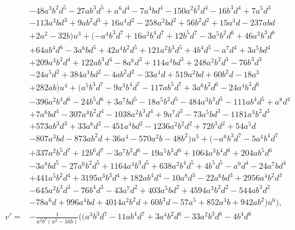 \documentclass{gtpart}
\theoremstyle{definition}
\theoremstyle{remark}
\numberwithin{equation}{section}
\numberwithin{thm}{section}
\begin{document}
\begin{equation*}
\begin{split}
          & - 48 a^3 b^2 d^5 - 27 a b^3 d^5 + a^6 d^4 - 7 a^4 b d^4 - 150 a^2 b^2 d^4 - 16 b^3 d^4 + 7 a^5 d^3 \\
          & - 113 a^3 b d^3 + 9 a b^2 d^3 + 16 a^4 d^2 - 258 a^2 b d^2 + 56 b^2 d^2 + 15 a^3 d - 237 a b d \\
          & + 2 a^2 - 32 b) u^3 + (-a^4 b^3 d^7 + 16 a^2 b^4 d^7 + 12 b^5 d^7 - 3 a^5 b^2 d^6 + 46 a^3 b^3 d^6 \\
          & + 64 a b^4 d^6 - 3 a^6 b d^5 + 42 a^4 b^2 d^5 + 121 a^2 b^3 d^5 + 4 b^4 d^5 - a^7 d^4 + 3 a^5 b d^4 \\
          & + 209 a^3 b^2 d^4 + 122 a b^3 d^4 - 8 a^6 d^3 + 114 a^4 b d^3 + 248 a^2 b^2 d^3 - 76 b^3 d^3 \\
          & - 24 a^5 d^2 + 384 a^3 b d^2 - 4 a b^2 d^2 - 33 a^4 d + 519 a^2 b d + 60 b^2 d - 18 a^3 \\
          & + 282 a b) u^4 + (a^5 b^3 d^7 - 9 a^3 b^4 d^7 - 117 a b^5 d^7 + 3 a^6 b^2 d^6 - 24 a^4 b^3 d^6 \\
          & - 396 a^2 b^4 d^6 - 24 b^5 d^6 + 3 a^7 b d^5 - 18 a^5 b^2 d^5 - 484 a^3 b^3 d^5 - 111 a b^4 d^5 + a^8 d^4 \\
          & + 7 a^6 b d^4 - 307 a^4 b^2 d^4 - 1038 a^2 b^3 d^4 + 9 a^7 d^3 - 73 a^5 b d^3 - 1181 a^3 b^2 d^3 \\
          & + 573 a b^3 d^3 + 33 a^6 d^2 - 451 a^4 b d^2 - 1236 a^2 b^2 d^2 + 72 b^3 d^2 + 54 a^5 d \\
          & - 807 a^3 b d - 873 a b^2 d + 36 a^4 - 570 a^2 b - 48 b^2) u^5 + (-a^6 b^3 d^7 - 5 a^4 b^4 d^7 \\
          & + 337 a^2 b^5 d^7 + 12 b^6 d^7 - 3 a^7 b^2 d^6 - 19 a^5 b^3 d^6 + 1064 a^3 b^4 d^6 + 204 a b^5 d^6 \\
          & - 3 a^8 b d^5 - 27 a^6 b^2 d^5 + 1164 a^4 b^3 d^5 + 638 a^2 b^4 d^5 + 4 b^5 d^5 - a^9 d^4 - 24 a^7 b d^4 \\
          & + 441 a^5 b^2 d^4 + 3195 a^3 b^3 d^4 + 182 a b^4 d^4 - 10 a^8 d^3 - 22 a^6 b d^3 + 2956 a^4 b^2 d^3 \\
          & - 645 a^2 b^3 d^3 - 76 b^4 d^3 - 43 a^7 d^2 + 403 a^5 b d^2 + 4594 a^3 b^2 d^2 - 544 a b^3 d^2 \\
          & - 78 a^6 d + 996 a^4 b d + 4014 a^2 b^2 d + 60 b^3 d - 57 a^5 + 852 a^3 b + 942 a b^2) u^6 \big), \\
     v' = & -\frac{1}{a^2 b^2 (a^2 - 16 b)} \big( (a^3 b^3 d^7 - 11 a b^4 d^7 + 3 a^4 b^2 d^6 - 33 a^2 b^3 d^6 - 4 b^4 d^6 \\

\end{split}
\end{equation*}
\end{document}
